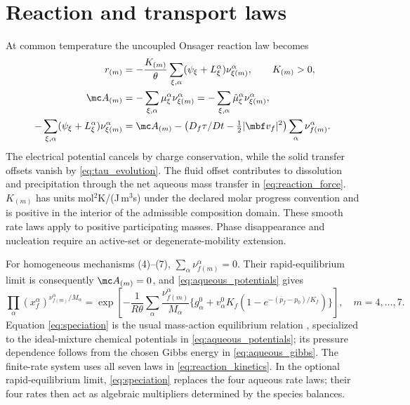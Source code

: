 \documentclass[11pt]{article}
\begin{document}
\section{Reaction and transport laws}
At common temperature the uncoupled Onsager reaction law becomes
\begin{align}
 r_{(m)}&=-\frac{K_{(m)}}{\theta}
 \sum_{\xi,\alpha}(\psi_\xi+L_\xi^\alpha)\nu_{\xi(m)}^\alpha,
 \qquad K_{(m)}>0,\label{eq:reaction_kinetics}\\
 \mc A_{(m)}&=-\sum_{\xi,\alpha}\mu_\xi^\alpha\nu_{\xi(m)}^\alpha
 =-\sum_{\xi,\alpha}\hat\mu_\xi^\alpha\nu_{\xi(m)}^\alpha,\label{eq:affinity}\\
 -\sum_{\xi,\alpha}(\psi_\xi+L_\xi^\alpha)\nu_{\xi(m)}^\alpha
 &=\mc A_{(m)}-
 \left(D_f\tau/Dt-\tfrac12|\mbf v_f|^2\right)\sum_\alpha\nu_{f(m)}^\alpha.
 \label{eq:reaction_force}
\end{align}
The electrical potential cancels by charge conservation, while the solid transfer offsets vanish by \eqref{eq:tau_evolution}. The fluid offset contributes to dissolution and precipitation through the net aqueous mass transfer in \eqref{eq:reaction_force}. \(K_{(m)}\) has units mol\(^2\)K/(J\,m\(^3\)s) under the declared molar progress convention and is positive in the interior of the admissible composition domain. These smooth rate laws apply to positive participating masses. Phase disappearance and nucleation require an active-set or degenerate-mobility extension.

For homogeneous mechanisms (4)--(7), \(\sum_\alpha\nu_{f(m)}^\alpha=0\). Their rapid-equilibrium limit is consequently \(\mc A_{(m)}=0\), and \eqref{eq:aqueous_potentials} gives
\begin{equation}
 \prod_\alpha(x_f^\alpha)^{\nu_{f(m)}^\alpha/M_\alpha}
 =\exp\left[-\frac1{R\theta}\sum_\alpha
 \frac{\nu_{f(m)}^\alpha}{M_\alpha}
 \{g_\alpha^0+v_\alpha^0K_f(1-e^{-(\bar p_f-p_0)/K_f})\}\right],
 \quad m=4,\ldots,7.
 \label{eq:speciation}
\end{equation}
Equation \eqref{eq:speciation} is the usual mass-action equilibrium relation \citep{ewing1994}, specialized to the ideal-mixture chemical potentials in \eqref{eq:aqueous_potentials}; its pressure dependence follows from the chosen Gibbs energy in \eqref{eq:aqueous_gibbs}. The finite-rate system uses all seven laws in \eqref{eq:reaction_kinetics}. In the optional rapid-equilibrium limit, \eqref{eq:speciation} replaces the four aqueous rate laws; their four rates then act as algebraic multipliers determined by the species balances.
\end{document}
